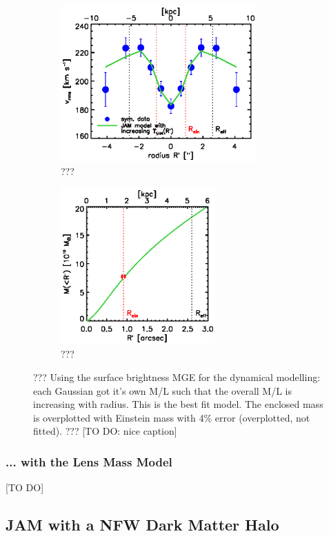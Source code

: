 \documentclass[useAMS,usenatbib]{mn2e}
\begin{document}
\begin{figure}
\centering
\begin{subfigure}{.5\textwidth}
  \centering
  \includegraphics[height=6cm]{fig/jam_G_vrms.ps}
  \caption{???}
  \label{fig:???}
\end{subfigure}%
\begin{subfigure}{.5\textwidth}
  \centering
  \includegraphics[height=6cm]{fig/jam_G_enclMass.ps}
  \caption{???}
  \label{fig:???}
\end{subfigure}
\caption{??? Using the surface brightness MGE for the dynamical modelling: each Gaussian got it's own M/L such that the overall M/L is increasing with radius. This is the best fit model. The enclosed mass is overplotted with Einstein mass with 4\% error (overplotted, not fitted). ??? [TO DO: nice caption]}
\label{fig:???}
\end{figure}

\subsubsection{... with the Lens Mass Model}

[TO DO]

\clearpage

\subsection{JAM with a NFW Dark Matter Halo}
\end{document}

